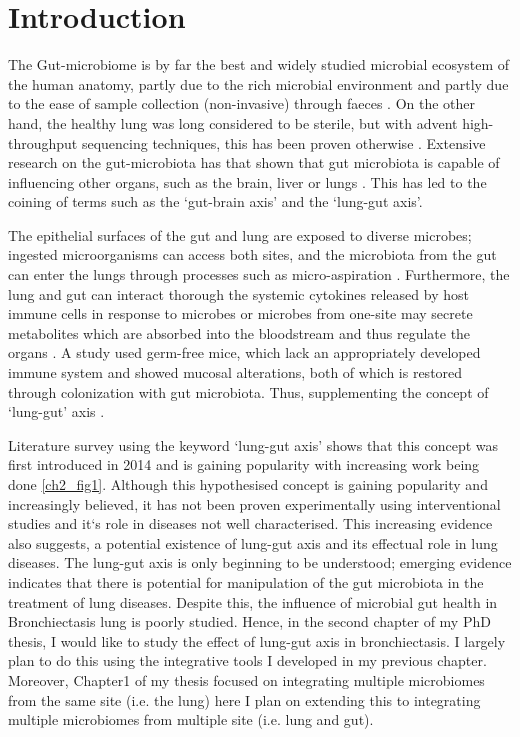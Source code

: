 \section{Introduction}

The Gut-microbiome is by far the best and widely studied microbial ecosystem of the human anatomy, partly due to the rich microbial environment and partly due to the ease of sample collection (non-invasive) through faeces \cite{Budden2017}. On the other hand, the healthy lung was long considered to be sterile, but with advent high-throughput sequencing techniques, this has been proven otherwise \cite{Barker2002}. Extensive research on the gut-microbiota has that shown that gut microbiota is capable of influencing other organs, such as the brain, liver or lungs \cite{Bell2019}. This has led to the coining of terms such as the `gut-brain axis' and the `lung-gut axis'. 

The epithelial surfaces of the gut and lung are exposed to diverse microbes; ingested microorganisms can access both sites, and the microbiota from the gut can enter the lungs through processes such as micro-aspiration \cite{Budden2017}. Furthermore, the lung and gut can interact thorough the systemic cytokines released by host immune cells in response to microbes or microbes from one-site may secrete metabolites which are absorbed into the bloodstream and thus regulate the organs \cite{Dang2019}. A study used germ-free mice, which lack an appropriately developed immune system and showed mucosal alterations, both of which is restored through colonization with gut microbiota. Thus, supplementing the concept of `lung-gut' axis \cite{Budden2017}. 

Literature survey using the keyword `lung-gut axis' shows that this concept was first introduced in 2014 and is gaining popularity with increasing work being done \ref{ch2_fig1}. Although this hypothesised concept is gaining popularity and increasingly believed, it has not been proven experimentally using interventional studies and it`s role in diseases not well characterised. This increasing evidence also suggests, a potential existence of lung-gut axis and its effectual role in lung diseases. The lung-gut axis is only beginning to be understood; emerging evidence indicates that there is potential for manipulation of the gut microbiota in the treatment of lung diseases. Despite this, the influence of microbial gut health in Bronchiectasis lung is poorly studied. Hence, in the second chapter of my PhD thesis, I would like to study the effect of lung-gut axis in bronchiectasis. I largely plan to do this using the integrative tools I developed in my previous chapter. Moreover, Chapter1 of my thesis focused on integrating multiple microbiomes from the same site (i.e. the lung) here I plan on extending this to integrating multiple microbiomes from multiple site (i.e. lung and gut). 

